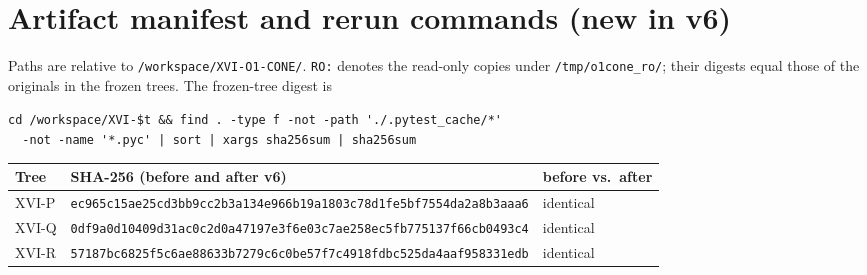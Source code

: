 \documentclass[11pt,a4paper]{article}
\newcommand{\loc}[1]{\nolinkurl{#1}}
\theoremstyle{plain}
\theoremstyle{definition}
\theoremstyle{remark}
\numberwithin{equation}{section}
\begin{document}
\section{Artifact manifest and rerun commands (new in v6)}
\label{app:artifacts}

Paths are relative to \loc{/workspace/XVI-O1-CONE/}.
\texttt{RO:} denotes the read-only copies under
\loc{/tmp/o1cone_ro/}; their digests equal those of the originals in
the frozen trees.
The frozen-tree digest is
\begin{center}\footnotesize
\verb!cd /workspace/XVI-$t && find . -type f -not -path './.pytest_cache/*'!\\
\verb!  -not -name '*.pyc' | sort | xargs sha256sum | sha256sum!
\end{center}

\begingroup\small
\begin{longtable}{@{}L{.10\linewidth}L{.52\linewidth}L{.25\linewidth}@{}}
\toprule
Tree & SHA-256 (before and after v6) & before vs.\ after\\
\midrule
\endfirsthead
\bottomrule
\endfoot
XVI-P & \texttt{\scriptsize ec965c15ae25cd3bb9cc2b3a134e966b}\newline\texttt{\scriptsize 19a1803c78d1fe5bf7554da2a8b3aaa6} & identical\\
XVI-Q & \texttt{\scriptsize 0df9a0d10409d31ac0c2d0a47197e3f6}\newline\texttt{\scriptsize e03c7ae258ec5fb775137f66cb0493c4} & identical\\
XVI-R & \texttt{\scriptsize 57187bc6825f5c6ae88633b7279c6c0b}\newline\texttt{\scriptsize e57f7c4918fdbc525da4aaf958331edb} & identical\\
\end{longtable}
\endgroup
\end{document}
